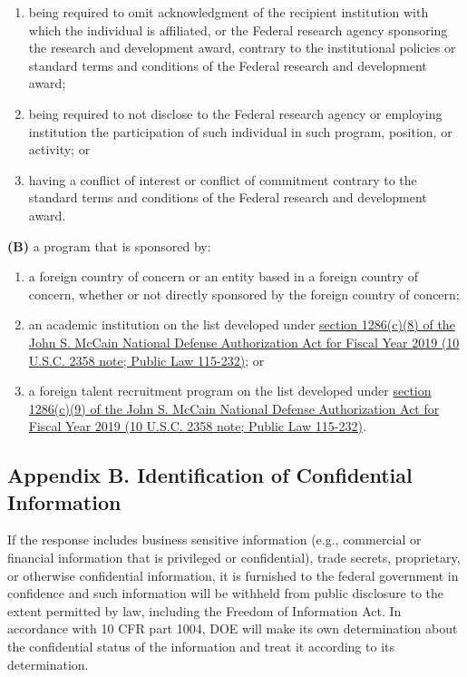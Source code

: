 \documentclass[
]{article}
\providecommand{\tightlist}{%
  \setlength{\itemsep}{0pt}\setlength{\parskip}{0pt}}
\begin{document}
\begin{enumerate}
  foreign organization as the recipient;
\item
  being required to omit acknowledgment of the recipient institution
  with which the individual is affiliated, or the Federal research
  agency sponsoring the research and development award, contrary to the
  institutional policies or standard terms and conditions of the Federal
  research and development award;
\item
  being required to not disclose to the Federal research agency or
  employing institution the participation of such individual in such
  program, position, or activity; or
\item
  having a conflict of interest or conflict of commitment contrary to
  the standard terms and conditions of the Federal research and
  development award.
\end{enumerate}

\textbf{(B)} a program that is sponsored by:

\begin{enumerate}
\def\labelenumi{\arabic{enumi}.}
\tightlist
\item
  a foreign country of concern or an entity based in a foreign country
  of concern, whether or not directly sponsored by the foreign country
  of concern;
\item
  an academic institution on the list developed under
  \href{https://rt.cto.mil/wp-content/uploads/Sec-1286-of-FY2021-NDAA.pdf\#page=2}{section
  1286(c)(8) of the John S. McCain National Defense Authorization Act
  for Fiscal Year 2019 (10 U.S.C. 2358 note; Public Law 115-232)}; or
\item
  a foreign talent recruitment program on the list developed under
  \href{https://rt.cto.mil/wp-content/uploads/Sec-1286-of-FY2021-NDAA.pdf\#page=3}{section
  1286(c)(9) of the John S. McCain National Defense Authorization Act
  for Fiscal Year 2019 (10 U.S.C. 2358 note; Public Law 115-232)}.
\end{enumerate}

\subsection{Appendix B. Identification of Confidential
Information}\label{appendix-b-identification-of-confidential-information}

If the response includes business sensitive information (e.g.,
commercial or financial information that is privileged or confidential),
trade secrets, proprietary, or otherwise confidential information, it is
furnished to the federal government in confidence and such information
will be withheld from public disclosure to the extent permitted by law,
including the Freedom of Information Act. In accordance with 10 CFR part
1004, DOE will make its own determination about the confidential status
of the information and treat it according to its determination.
\end{document}
